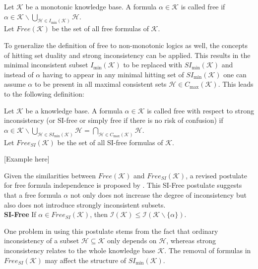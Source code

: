 \begin{definition}
    Let \(\mathcal{K}\) be a monotonic knowledge base. A formula \(\alpha \in \mathcal{K}\) is called free if\\
    \(\alpha \in \mathcal{K} \backslash \bigcup\limits_{\mathcal{H} \in I_{\min}(\mathcal{K})} \mathcal{H}\).\\
    Let \(Free(\mathcal{K})\) be the set of all free formulas of \(\mathcal{K}\).
\end{definition}

To generalize the definition of free to non-monotonic logics as well, the concepts of hitting set duality and strong inconsistency can be applied. This results in the minimal inconsistent subset \(I_{\min}(\mathcal{K})\) to be replaced with \(SI_{\min}(\mathcal{K})\) and instead of \(\alpha\) having to appear in any minimal hitting set of \(SI_{\min}(\mathcal{K})\) one can assume \(\alpha\) to be present in all maximal consistent sets \(\mathcal{H} \in C_{\max}(\mathcal{K})\). This leads to the following definition:

\begin{definition}
    Let \(\mathcal{K}\) be a knowledge base. A formula \(\alpha \in \mathcal{K}\) is called free with respect to strong inconsistency (or SI-free or simply free if there is no risk of confusion) if\\
    \(\alpha \in \mathcal{K} \backslash \bigcup\limits_{\mathcal{H} \in SI_{\min}(\mathcal{K})} \mathcal{H} = \bigcap\limits_{\mathcal{H} \in C_{\max}(\mathcal{K})} \mathcal{H}\).\\
    Let \(Free_{SI}(\mathcal{K})\) be the set of all SI-free formulas of \(\mathcal{K}\).
\end{definition}

[Example here]

Given the similarities between \(Free(\mathcal{K})\) and \(Free_{SI}(\mathcal{K})\), a revised postulate for free formula independence is proposed by \cite{ulbricht_handling_2020}. This SI-Free postulate suggests that a free formula \(\alpha\) not only does not increase the degree of inconsistency but also does not introduce strongly inconsistent subsets.
\\
\textbf{SI-Free}
If \(\alpha \in Free_{SI}(\mathcal{K})\), then \(\mathcal{I}(\mathcal{K}) \leq \mathcal{I}(\mathcal{K} \backslash \{\alpha\})\).

One problem in using this postulate stems from the fact that ordinary inconsistency of a subset \(\mathcal{H} \subseteq \mathcal{K}\) only depends on \(\mathcal{H}\), whereas strong inconsistency relates to the whole knowledge base \(\mathcal{K}\). The removal of formulas in \(Free_{SI}(\mathcal{K})\) may affect the structure of \(SI_{\min}(\mathcal{K})\).

